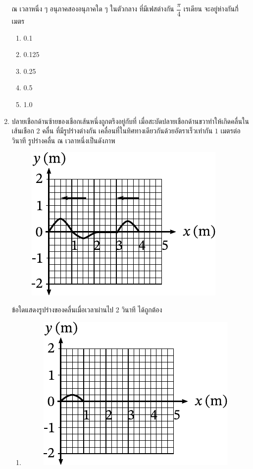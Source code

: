 \documentclass[a4paper, 12pt]{article}
\begin{document}
\begin{enumerate}
\begin{figure}[H]
          \end{figure}
          ณ เวลาหนึ่ง ๆ อนุภาคสองอนุภาคใด ๆ ในตัวกลาง ที่มีเฟสต่างกัน \(\dfrac{\pi}{4}\) เรเดียน จะอยู่ห่างกันกี่เมตร
          \begin{enumerate}
              \item 0.1
              \item 0.125
              \item 0.25
              \item 0.5
              \item 1.0
          \end{enumerate}
          \newpage
    \item ปลายเชือกด้านซ้ายของเชือกเส้นหนึ่งถูกตรึงอยู่กับที่ เมื่อสะบัดปลายเชือกด้านขวาทำให้เกิดคลื่นในเส้นเชือก 2 คลื่น ที่มีรูปร่างต่างกัน เคลื่อนที่ในทิศทางเดียวกันด้วยอัตราเร็วเท่ากัน \(1\) เมตรต่อวินาที รูปร่างคลื่น ณ เวลาหนึ่งเป็นดังภาพ \\
          \begin{figure}[H]
              \centering
              \includegraphics{images/21_9_0.pdf}
          \end{figure}
          ข้อใดแสดงรูปร่างของคลื่นเมื่อเวลาผ่านไป 2 วินาที ได้ถูกต้อง
          \begin{enumerate}
              \item \hfill
                    \begin{figure}[H]
                        \includegraphics{images/21_9_1.pdf}

\end{figure}
\end{enumerate}
\end{enumerate}
\end{document}
